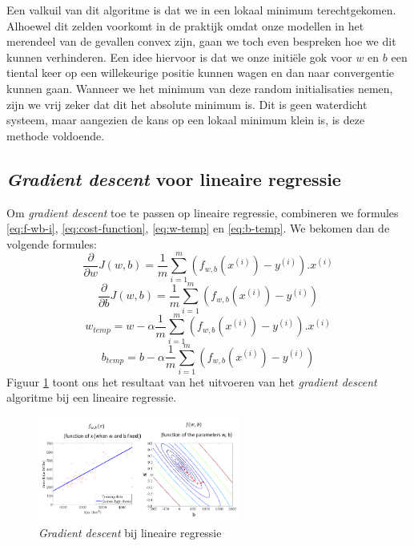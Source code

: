 \newline
Een valkuil van dit algoritme is dat we in een lokaal minimum terechtgekomen. Alhoewel dit zelden voorkomt in de praktijk omdat onze modellen in het merendeel van de gevallen convex zijn, gaan we toch even bespreken hoe we dit kunnen verhinderen. Een idee hiervoor is dat we onze initiële gok voor $w$ en $b$ een tiental keer op een willekeurige positie kunnen wagen en dan naar convergentie kunnen gaan. Wanneer we het minimum van deze random initialisaties nemen, zijn we vrij zeker dat dit het absolute minimum is. Dit is geen waterdicht systeem, maar aangezien de kans op een lokaal minimum klein is, is deze methode voldoende.

\subsection{\textit{Gradient descent} voor lineaire regressie}

Om \textit{gradient descent} toe te passen op lineaire regressie, combineren we formules \ref{eq:f-wb-i}, \ref{eq:cost-function}, \ref{eq:w-temp} en \ref{eq:b-temp}. We bekomen dan de volgende formules:
\begin{equation}
	\frac{\partial}{\partial w}J(w, b) = \frac{1}{m}\sum_{i=1}^{m}(f_{w,b}(x^{(i)}) - y^{(i)}) . x^{(i)}
\end{equation}
\begin{equation}
	\frac{\partial}{\partial b}J(w, b) = \frac{1}{m}\sum_{i=1}^{m}(f_{w,b}(x^{(i)}) - y^{(i)})
\end{equation}
\begin{equation}
	w_{temp} = w - \alpha \frac{1}{m}\sum_{i=1}^{m}(f_{w,b}(x^{(i)}) - y^{(i)}) . x^{(i)}
\end{equation}
\begin{equation}
	b_{temp} = b - \alpha \frac{1}{m}\sum_{i=1}^{m}(f_{w,b}(x^{(i)}) - y^{(i)})
\end{equation}
\noindent
Figuur \ref{fig:gradient-descent} toont ons het resultaat van het uitvoeren van het \textit{gradient descent} algoritme bij een lineaire regressie.
\begin{figure}[h]
	\centering
	\includegraphics[width=0.6\textwidth]{images/7-gradient-descent.png}
	\caption{\textit{Gradient descent} bij lineaire regressie}
	\label{fig:gradient-descent}
\end{figure}

